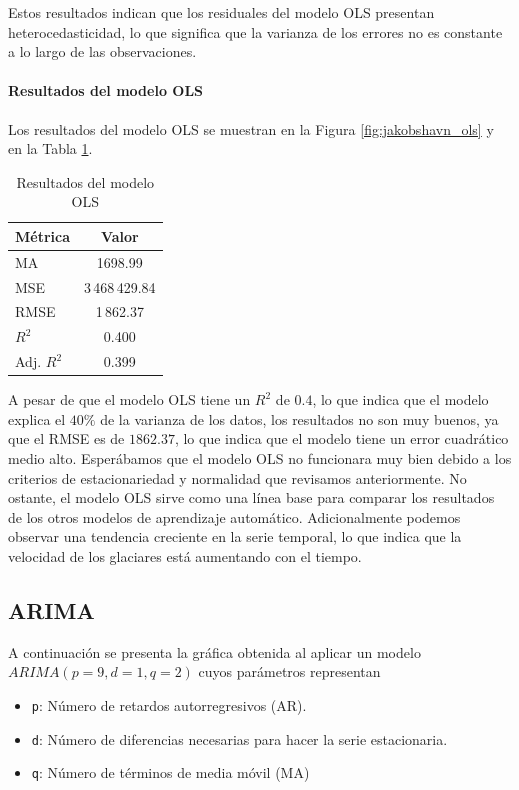 \documentclass[sigconf,language=spanish]{acmart}
\begin{document}
Estos resultados indican que los residuales del modelo OLS presentan heterocedasticidad, lo que significa que la varianza de los errores no es constante a lo largo de las observaciones.

\paragraph{Resultados del modelo OLS}

Los resultados del modelo OLS se muestran en la Figura \ref{fig:jakobshavn_ols} y en la Tabla \ref{tab:ols}.

\begin{table}[H]
  \caption{Resultados del modelo OLS}
  \label{tab:ols}
  \begin{tabular}{lc}
    \toprule
    Métrica & Valor \\
    \midrule
    MA & 1698.99 \\
    MSE & 3\,468\,429.84 \\
    RMSE & 1\,862.37 \\
    $R^2$ & 0.400 \\
    Adj. $R^2$ & 0.399 \\
    \bottomrule
  \end{tabular}
\end{table}

A pesar de que el modelo OLS tiene un $R^2$ de $0.4$, lo que indica que el modelo explica el $40\%$ de la varianza de los datos,
los resultados no son muy buenos, ya que el RMSE es de $1862.37$, lo que indica que el modelo tiene un error cuadrático medio alto.
Esperábamos que el modelo OLS no funcionara muy bien debido a los criterios de estacionariedad y normalidad que revisamos anteriormente.
No ostante, el modelo OLS sirve como una línea base para comparar los resultados de los otros modelos de aprendizaje automático.
Adicionalmente podemos observar una tendencia creciente en la serie temporal, lo que indica que la velocidad de los glaciares está aumentando con el tiempo.

\subsection{ARIMA}

A continuación se presenta la gráfica obtenida al aplicar un modelo $ARIMA(p=9,d=1,q=2)$ cuyos parámetros representan
\begin{itemize}
  \item \verb|p|: Número de retardos autorregresivos (AR).
  \item \verb|d|: Número de diferencias necesarias para hacer la serie estacionaria.
  \item \verb|q|: Número de términos de media móvil (MA)
\end{itemize}
\end{document}
